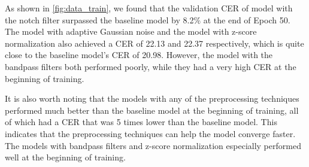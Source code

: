 As shown in \ref{fig:data_train}, we found that the validation CER of model with the notch filter surpassed the baseline model by 8.2\% at the end of Epoch 50.
The model with adaptive Gaussian noise and the model with z-score normalization also achieved a CER of 22.13 and 22.37 respectively, 
which is quite close to the baseline model's CER of 20.98.
However, the model with the bandpass filters both performed poorly, while they had a very high CER at the beginning of training.

It is also worth noting that the models with any of the preprocessing techniques performed much better than the baseline model at the beginning of training, 
all of which had a CER that was 5 times lower than the baseline model.
This indicates that the preprocessing techniques can help the model converge faster.
The models with bandpass filters and z-score normalization especially performed well at the beginning of training.
